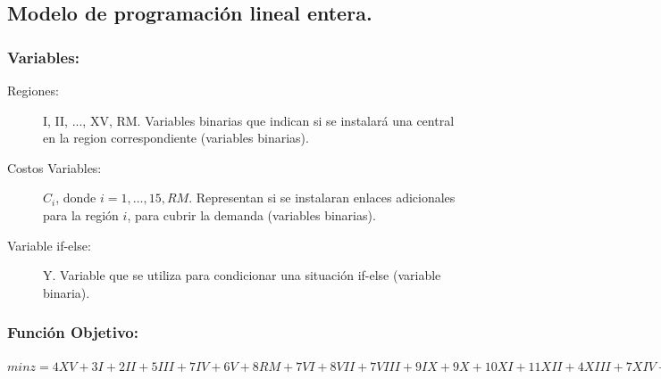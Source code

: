 \documentclass[12pt,letterpaper]{article}
\begin{document}
\subsection{Modelo de programación lineal entera.}
\subsubsection{Variables:	}
\begin{description}
\item[Regiones:] I, II, ..., XV, RM. Variables binarias que indican si se instalará una central en la region correspondiente (variables binarias).
\item[Costos Variables:] $C_i$, donde $i={1,\dots,15,RM}$. Representan si se instalaran enlaces adicionales para la región $i$, para cubrir la demanda (variables binarias).
\item[Variable if-else:] Y. Variable que se utiliza para condicionar una situación if-else (variable binaria).
\end{description}

\subsubsection{Función Objetivo:}
$min z = 4 XV + 3 I + 2 II + 5 III + 7 IV + 6 V + 8 RM + 7 VI + 8 VII + 7 VIII + 9 IX + 9 X + 10 XI + 11 XII + 4 XIII + 7 XIV + 2 C_15 + 2 C_1 + 2 C_2 + 2 C_3 + 2 C_4 + 2 C_5 + 2 C_{RM} + 2 C_6 + 2 C_7 + 2 C_8 + 2 C_9 + 2 C_{10} + 2 C_{11} + 2 C_{12} + 2 C_{13} + 2 C_{14}$
\end{document}
